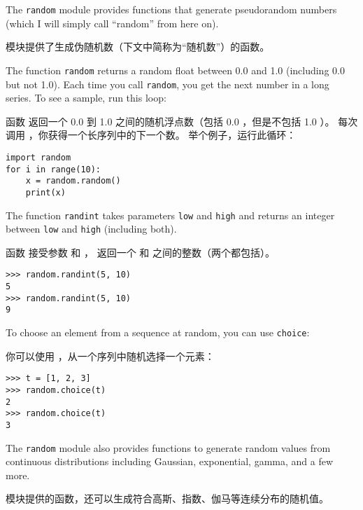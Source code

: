 
The {\tt random} module provides functions that generate
pseudorandom numbers (which I will simply call ``random'' from
here on).

 模块提供了生成伪随机数（下文中简称为``随机数''）的函数。


The function {\tt random} returns a random float
between 0.0 and 1.0 (including 0.0 but not 1.0).  Each time you
call {\tt random}, you get the next number in a long series.  To see a
sample, run this loop:

函数  返回一个 0.0 到 1.0 之间的随机浮点数（包括 0.0 ，但是不包括 1.0 ）。  每次调用  ，你获得一个长序列中的下一个数。
举个例子，运行此循环：

\begin{lstlisting}
import random
for i in range(10):
    x = random.random()
    print(x)
\end{lstlisting}
%
The function {\tt randint} takes parameters {\tt low} and
{\tt high} and returns an integer between {\tt low} and
{\tt high} (including both).

函数  接受参数  和  ，
返回一个  和  之间的整数（两个都包括）。


\begin{lstlisting}
>>> random.randint(5, 10)
5
>>> random.randint(5, 10)
9
\end{lstlisting}
%
To choose an element from a sequence at random, you can use
{\tt choice}:

你可以使用  ，从一个序列中随机选择一个元素：


\begin{lstlisting}
>>> t = [1, 2, 3]
>>> random.choice(t)
2
>>> random.choice(t)
3
\end{lstlisting}

%
The {\tt random} module also provides functions to generate
random values from continuous distributions including
Gaussian, exponential, gamma, and a few more.

 模块提供的函数，还可以生成符合高斯、指数、伽马等连续分布的随机值。

